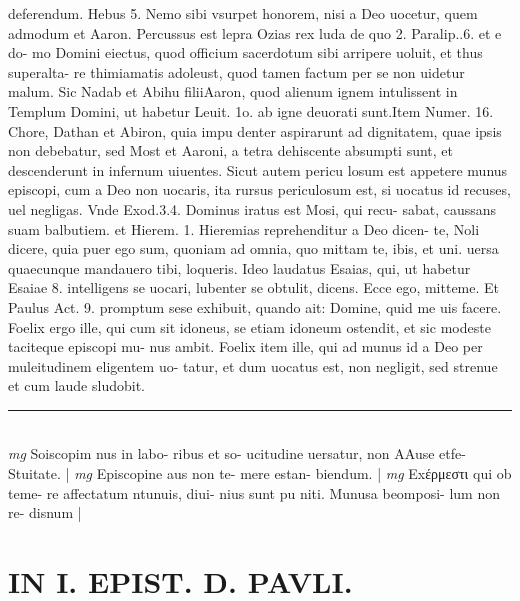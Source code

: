 \documentclass{article}
\begin{document}
\begin{pages}
deferendum. Hebus 5. Nemo sibi vsurpet honorem, nisi a Deo uocetur, quem admodum et Aaron. Percussus est lepra Ozias rex luda de quo 2. Paralip..6. et e do- mo Domini eiectus, quod officium sacerdotum sibi arripere uoluit, et thus superalta- re thimiamatis adoleust, quod tamen factum per se non uidetur malum. Sic Nadab et Abihu filiiAaron, quod alienum ignem intulissent in Templum Domini, ut habetur Leuit. 1o. ab igne deuorati sunt.Item Numer. 16. Chore, Dathan et Abiron, quia impu denter aspirarunt ad dignitatem, quae ipsis non debebatur, sed Most et Aaroni, a tetra dehiscente absumpti sunt, et descenderunt in infernum uiuentes. Sicut autem pericu losum est appetere munus episcopi, cum a Deo non uocaris, ita rursus periculosum est, si uocatus id recuses, uel negligas. Vnde Exod.3.4. Dominus iratus est Mosi, qui recu- sabat, caussans suam balbutiem. et Hierem. 1. Hieremias reprehenditur a Deo dicen- te, Noli dicere, quia puer ego sum, quoniam ad omnia, quo mittam te, ibis, et uni. uersa quaecunque mandauero tibi, loqueris. Ideo laudatus Esaias, qui, ut habetur Esaiae 8. intelligens se uocari, lubenter se obtulit, dicens. Ecce ego, mitteme. Et Paulus Act. 9. promptum sese exhibuit, quando ait: Domine, quid me uis facere. Foelix ergo ille, qui cum sit idoneus, se etiam idoneum ostendit, et sic modeste taciteque episcopi mu- nus ambit. Foelix item ille, qui ad munus id a Deo per muleitudinem eligentem uo- tatur, et dum uocatus est, non negligit, sed strenue et cum laude sludobit.  \pend
\vspace{0.5cm}\noindent
\vspace{0.2cm}\rule{1cm}{0.2pt}\\ 
\hspace{0.2cm}\textit{mg}
\footnotesize Soiscopim nus in labo- ribus et so- ucitudine uersatur, non AAuse etfe- Stuitate. 
\normalsize| 
\hspace{0.2cm}\textit{mg}
\footnotesize Episcopine aus non te- mere estan- biendum. 
\normalsize| 
\hspace{0.2cm}\textit{mg}
\footnotesize Exέρμεστι qui ob teme- re affectatum ntunuis, diui- nius sunt pu niti. Munusa beomposi- lum non re- disnum 
\normalsize| 
\section*{IN I. EPIST. D. PAVLI. }
\marginpar{[ p.76 ]}
{}

\end{pages}
\end{document}

